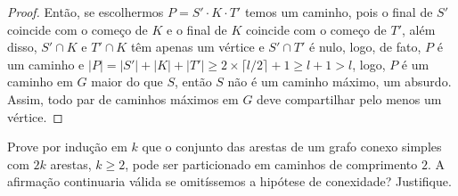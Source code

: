 \documentclass[12pt]{article}
\newenvironment{problem}[2][Ex]{\begin{trivlist}
\item[\hskip \labelsep {\bfseries #1}\hskip \labelsep {\bfseries #2.}]}{\end{trivlist}}
\begin{document}
\begin{proof}
Então, se escolhermos $P = S' \cdot K \cdot T'$ temos um caminho, pois o final de $S'$ coincide com o começo de $K$ e o final de $K$ coincide com o começo de $T'$, além disso, $S' \cap K$ e $T' \cap K$ têm apenas um vértice e $S' \cap T'$ é nulo, logo, de fato, $P$ é um caminho e $|P| = |S'| + |K| + |T'| \geq 2 \times \lceil l/2 \rceil + 1 \geq l + 1 > l$, logo, $P$ é um caminho em $G$ maior do que $S$, então $S$ não é um caminho máximo, um absurdo. Assim, todo par de caminhos máximos em $G$ deve compartilhar pelo menos um vértice.
\end{proof}

\begin{problem}{E7}
Prove por indução em $k$ que o conjunto das arestas de um grafo conexo simples com $2k$ arestas, $k \geq 2$, pode ser particionado em caminhos de comprimento $2$. A afirmação continuaria válida se omitíssemos a hipótese de conexidade? Justifique.
\end{problem}
\end{document}
